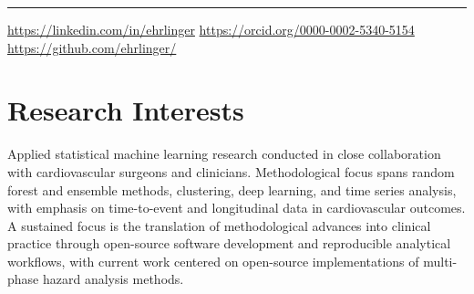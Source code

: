\documentclass[letterpaper,11pt]{nih}
\begin{document}
\address{Hiram, Ohio\\ %
	john.ehrlinger@gmail.com}
\address{\\Cardiovascular Outcomes, Registries and Research\\Heart, Vascular \& Thoracic Institute\\ ehrlinj@ccf.org}
\printcentername
\rule{\textwidth}{1pt}
\vspace*{-2em}
\begin{center}
 \url{https://linkedin.com/in/ehrlinger} \hfill \url{https://orcid.org/0000-0002-5340-5154} \hfill \url{https://github.com/ehrlinger/}
\end{center}

\section*{Research Interests}
% 
% 

Applied statistical machine learning research conducted in close collaboration with cardiovascular surgeons and clinicians. Methodological focus spans random forest and ensemble methods, clustering, deep learning, and time series analysis, with emphasis on time-to-event and longitudinal data in cardiovascular outcomes. A sustained focus is the translation of methodological advances into clinical practice through open-source software development and reproducible analytical workflows, with current work centered on open-source implementations of multi-phase hazard analysis methods.
\end{document}
